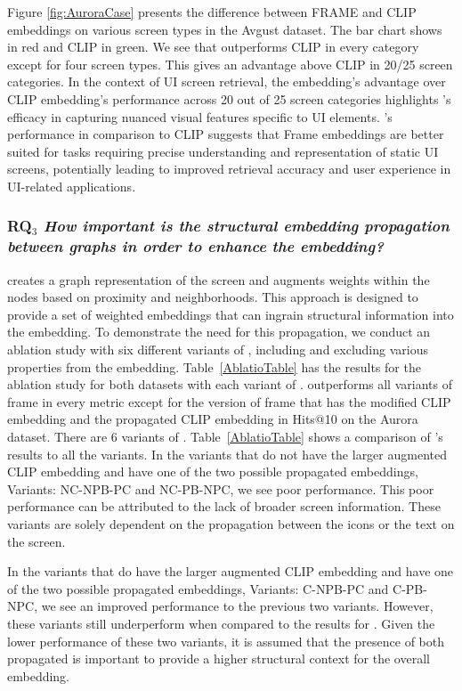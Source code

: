 Figure \ref{fig:AuroraCase} presents the difference between FRAME and CLIP embeddings on various screen types in the Avgust dataset. The bar chart shows \FRAME in red and CLIP in green. We see that \FRAME outperforms CLIP in every category except for four screen types. This gives \FRAME an advantage above CLIP in 20/25 screen categories. In the context of UI screen retrieval, the \FRAME embedding's advantage over CLIP embedding's performance across 20 out of 25 screen categories highlights \FRAME 's efficacy in capturing nuanced visual features specific to UI elements. \FRAME's performance in comparison to CLIP suggests that Frame embeddings are better suited for tasks requiring precise understanding and representation of static UI screens, potentially leading to improved retrieval accuracy and user experience in UI-related applications. 


\subsubsection{\textbf{RQ$_3$} \textit{How important is the structural embedding propagation between graphs in order to enhance the embedding?}}


\FRAME creates a graph representation of the screen and augments weights within the nodes based on proximity and neighborhoods. This approach is designed to provide a set of weighted embeddings that can ingrain structural information into the embedding. To demonstrate the need for this propagation, we conduct an ablation study with six different variants of \FRAME, including and excluding various properties from the embedding. Table~\ref{AblatioTable} has the results for the ablation study for both datasets with each variant of \FRAME. \FRAME outperforms all variants of frame in every metric except for the version of frame that has the modified CLIP embedding and the propagated CLIP embedding in Hits@10 on the Aurora dataset. There are 6 variants of \FRAME. Table~\ref{AblatioTable} shows a comparison of \FRAME's results to all the variants.  
In the variants that do not have the larger augmented CLIP embedding and have one of the two possible propagated embeddings, Variants: NC-NPB-PC and NC-PB-NPC, we see poor performance. This poor performance can be attributed to the lack of broader screen information. These variants are solely dependent on the propagation between the icons or the text on the screen. 

In the variants that do have the larger augmented CLIP embedding and have one of the two possible propagated embeddings, Variants: C-NPB-PC and C-PB-NPC, we see an improved performance to the previous two variants. However, these variants still underperform when compared to the results for \FRAME. Given the lower performance of these two variants, it is assumed that the presence of both propagated is important to provide a higher structural context for the overall embedding. 

